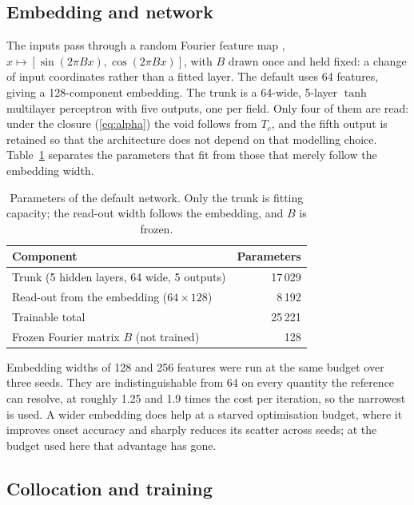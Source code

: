 \documentclass[11pt,a4paper]{article}
\begin{document}
\subsection{Embedding and network}\label{sec:embedding}

The inputs pass through a random Fourier feature map \cite{tancik},
$x \mapsto [\sin(2\pi Bx), \cos(2\pi Bx)]$, with $B$ drawn once and held fixed: a change of
input coordinates rather than a fitted layer. The default uses 64 features, giving a
128-component embedding. The trunk is a 64-wide, 5-layer $\tanh$ multilayer perceptron with
five outputs, one per field. Only four of them are read: under the closure
(\ref{eq:alpha}) the void follows from $T_c$, and the fifth output is retained so that the
architecture does not depend on that modelling choice. Table~\ref{tab:netparams} separates
the parameters that fit from those that merely follow the embedding width.

\begin{table}[tbp]
\caption{Parameters of the default network. Only the trunk is fitting capacity; the
read-out width follows the embedding, and $B$ is frozen.}
\label{tab:netparams}
\centering
\begin{tabular}{@{}lr@{}}
\toprule
Component & Parameters \\
\midrule
Trunk (5 hidden layers, 64 wide, 5 outputs) & 17\,029 \\
Read-out from the embedding ($64 \times 128$) & 8\,192 \\
\midrule
Trainable total & 25\,221 \\
Frozen Fourier matrix $B$ (not trained) & 128 \\
\bottomrule
\end{tabular}
\end{table}

Embedding widths of 128 and 256 features were run at the same budget over three seeds. They
are indistinguishable from 64 on every quantity the reference can resolve, at roughly 1.25
and 1.9 times the cost per iteration, so the narrowest is used. A wider embedding does help
at a starved optimisation budget, where it improves onset accuracy and sharply reduces its
scatter across seeds; at the budget used here that advantage has gone.

\subsection{Collocation and training}\label{sec:training}
\end{document}
